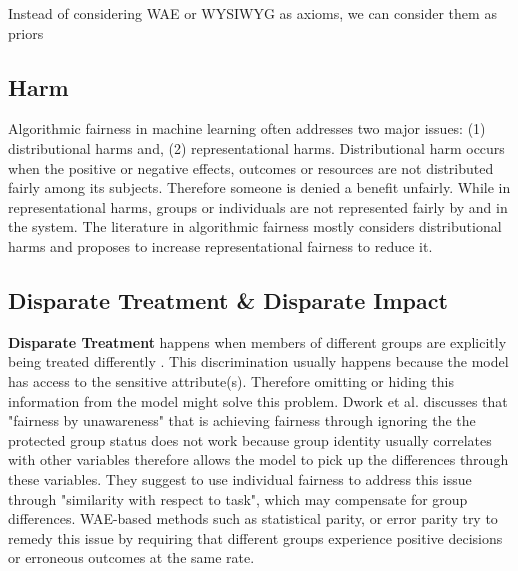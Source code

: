         
        Instead of considering WAE or WYSIWYG as axioms, we can consider them as priors
     
    \subsection{Harm}
        Algorithmic fairness in machine learning often addresses two major issues: (1) distributional harms and, (2) representational harms\cite{crawford2017trouble}. Distributional harm occurs when the positive or negative effects, outcomes or resources are not distributed fairly among its subjects. Therefore someone is denied a benefit unfairly. While in representational harms, groups or individuals are not represented fairly by and in the system. The literature in algorithmic fairness mostly considers distributional harms and proposes to increase representational fairness to reduce it.
    
    \subsection{Disparate Treatment \& Disparate Impact}
        
        \textbf{Disparate Treatment} happens when members of different groups are explicitly being treated differently \cite{barocas2016big}. This discrimination usually happens because the model has access to the sensitive attribute(s). Therefore omitting or hiding this information from the model might solve this problem.
        Dwork et al. \cite{Dwork2012individual} discusses that "fairness by unawareness" that is achieving fairness through ignoring the the protected group status does not work because group identity usually correlates with other variables \cite{Feldman2015} therefore allows the model to pick up the differences through these variables. They suggest to use individual fairness to address this issue through "similarity with respect to task", which may compensate for group differences. WAE-based methods such as statistical parity, or error parity try to remedy this issue by requiring that different groups experience positive decisions or erroneous outcomes at the same rate.
        
